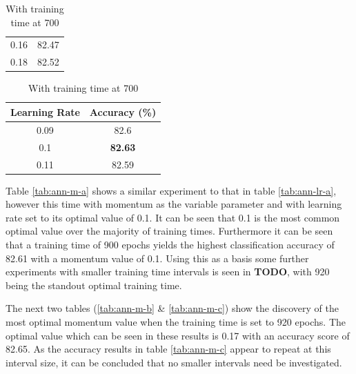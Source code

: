\documentclass[12pt]{article}
\begin{document}
\begin{table}[H]
\begin{subtable}{.49\linewidth}
\begin{tabular}{c|c}
            0.16  & 82.47 \\
            0.18  & 82.52 \\
            \bottomrule
          \end{tabular}
          \label{tab:ann-lr-c}
        \end{subtable}
        \begin{subtable}{.49\linewidth}
          \centering
          \caption{With training time at 700}
          \begin{tabular}{c|c}
            \toprule
            \multicolumn{1}{l|}{Learning Rate} & \multicolumn{1}{l}{Accuracy (\%)} \\
            \midrule
            0.09  & 82.6 \\
            0.1   & \textbf{82.63} \\
            0.11  & 82.59 \\
            \bottomrule
          \end{tabular}
          \label{tab:ann-lr-d}
        \end{subtable}
        \label{tab:ann-lr}
      \end{table}
      \doublespacing

      Table \ref{tab:ann-m-a} shows a similar experiment to that in table \ref{tab:ann-lr-a}, however this time with momentum as the variable parameter and with learning rate set to its optimal value of 0.1. It can be seen that 0.1 is the most common optimal value over the majority of training times. Furthermore it can be seen that a training time of 900 epochs yields the highest classification accuracy of 82.61 with a momentum value of 0.1. Using this as a basis some further experiments with smaller training time intervals is seen in \textbf{TODO}, with 920 being the standout optimal training time.

      The next two tables (\ref{tab:ann-m-b} \& \ref{tab:ann-m-c}) show the discovery of the most optimal momentum value when the training time is set to 920 epochs. The optimal value which can be seen in these results is 0.17 with an accuracy score of 82.65. As the accuracy results in table \ref{tab:ann-m-c} appear to repeat at this interval size, it can be concluded that no smaller intervals need be investigated.
\end{document}
